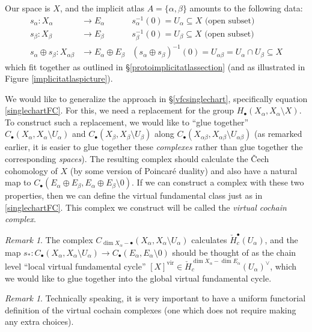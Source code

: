 \documentclass[12pt]{article}
\theoremstyle{definition}
\theoremstyle{remark}
\newtheorem{remark}[theorem]{Remark}
\numberwithin{equation}{subsection}
\newcommand{\cH}{\check H}
\newcommand{\vir}{\mathrm{vir}}
\begin{document}
Our space is $X$, and the implicit atlas $A=\{\alpha,\beta\}$ amounts to the following data:
\begin{align}
s_\alpha:X_\alpha&\to E_\alpha&s_\alpha^{-1}(0)=U_\alpha\subseteq X\text{ (open subset)}\\
s_\beta:X_\beta&\to E_\beta&s_\beta^{-1}(0)=U_\beta\subseteq X\text{ (open subset)}\\
s_\alpha\oplus s_\beta:X_{\alpha\beta}&\to E_\alpha\oplus E_\beta&(s_\alpha\oplus s_\beta)^{-1}(0)=U_{\alpha\beta}=U_\alpha\cap U_\beta\subseteq X
\end{align}
which fit together as outlined in \S\ref{protoimplicitatlassection} (and as illustrated in Figure \ref{implicitatlaspicture}).

We would like to generalize the approach in \S\ref{vfcsinglechart}, specifically equation \eqref{singlechartFC}.  For this, we need a replacement for the group $H_\bullet(X_\alpha,X_\alpha\setminus X)$.  To construct such a replacement, we would like to ``glue together'' $C_\bullet(X_\alpha,X_\alpha\setminus U_\alpha)$ and $C_\bullet(X_\beta,X_\beta\setminus U_\beta)$ along $C_\bullet(X_{\alpha\beta},X_{\alpha\beta}\setminus U_{\alpha\beta})$ (as remarked earlier, it is easier to glue together these \emph{complexes} rather than glue together the corresponding \emph{spaces}).  The resulting complex should calculate the \v Cech cohomology of $X$ (by some version of Poincar\'e duality) and also have a natural map to $C_\bullet(E_\alpha\oplus E_\beta,E_\alpha\oplus E_\beta\setminus 0)$.  If we can construct a complex with these two properties, then we can define the virtual fundamental class just as in \eqref{singlechartFC}.  This complex we construct will be called the \emph{virtual cochain complex}.

\begin{remark}
The complex $C_{\dim X_\alpha-\bullet}(X_\alpha,X_\alpha\setminus U_\alpha)$ calculates $\cH^\bullet_c(U_\alpha)$, and the map $s_\ast:C_\bullet(X_\alpha,X_\alpha\setminus U_\alpha)\to C_\bullet(E_\alpha,E_\alpha\setminus 0)$ should be thought of as the chain level ``local virtual fundamental cycle'' $[X]^\vir\in\cH^{\dim X_\alpha-\dim E_\alpha}_c(U_\alpha)^\vee$, which we would like to glue together into the global virtual fundamental cycle.
\end{remark}

\begin{remark}
Technically speaking, it is very important to have a uniform functorial definition of the virtual cochain complexes (one which does not require making any extra choices).
\end{remark}
\end{document}
